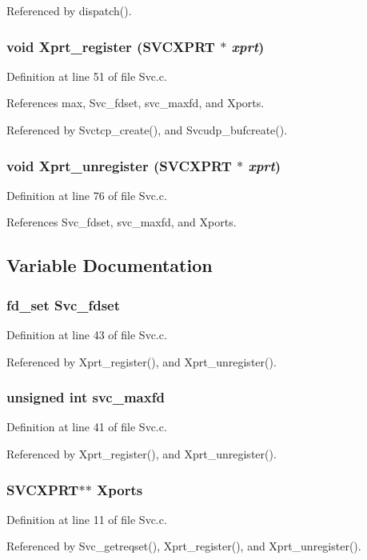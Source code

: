 Referenced by dispatch().
\subsubsection{\setlength{\rightskip}{0pt plus 5cm}void Xprt\_\-register (SVCXPRT $\ast$ {\em xprt})}\label{Svc_8c_a8}




Definition at line 51 of file Svc.c.

References max, Svc\_\-fdset, svc\_\-maxfd, and Xports.

Referenced by Svctcp\_\-create(), and Svcudp\_\-bufcreate().
\subsubsection{\setlength{\rightskip}{0pt plus 5cm}void Xprt\_\-unregister (SVCXPRT $\ast$ {\em xprt})}\label{Svc_8c_a9}




Definition at line 76 of file Svc.c.

References Svc\_\-fdset, svc\_\-maxfd, and Xports.

\subsection{Variable Documentation}
\subsubsection{\setlength{\rightskip}{0pt plus 5cm}fd\_\-set {\bf Svc\_\-fdset}}\label{Svc_8c_a6}




Definition at line 43 of file Svc.c.

Referenced by Xprt\_\-register(), and Xprt\_\-unregister().
\subsubsection{\setlength{\rightskip}{0pt plus 5cm}unsigned int {\bf svc\_\-maxfd}}\label{Svc_8c_a5}




Definition at line 41 of file Svc.c.

Referenced by Xprt\_\-register(), and Xprt\_\-unregister().
\subsubsection{\setlength{\rightskip}{0pt plus 5cm}SVCXPRT$\ast$$\ast$ {\bf Xports}}\label{Svc_8c_a3}




Definition at line 11 of file Svc.c.

Referenced by Svc\_\-getreqset(), Xprt\_\-register(), and Xprt\_\-unregister().
